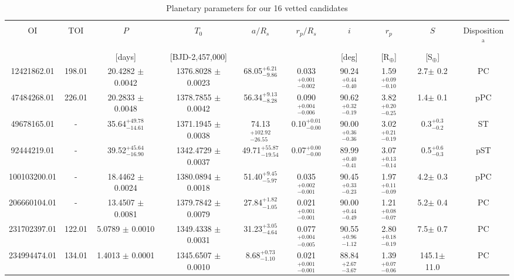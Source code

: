 \clearpage
\begin{landscape}
\begin{table*}
  \small
  \renewcommand{\arraystretch}{0.7}
  \caption{Planetary parameters for our 16 vetted candidates}
  \label{oriontable:planets}
  \begin{tabular}{cccccccccc}
    \hline \\ [-1ex]
    OI & TOI & $P$ & $T_0$ & $a/R_s$ & $r_p/R_s$ & $i$ & $r_p$ & $S$ & Disposition$^{\text{a}}$ \\ 
    &  & [days] & [BJD-2,457,000] &  &  & [deg] & [R$_{\oplus}$] & [S$_{\oplus}$] & \\
    \hline
    12421862.01 & 198.01 & 20.4282 $\pm$ 0.0042 & 1376.8028 $\pm$ 0.0023 & 68.05$^{+6.21}_{-9.86}$ & 0.033$^{+0.001}_{-0.002}$ & 90.24$^{+0.44}_{-0.40}$ & 1.59$^{+0.09}_{-0.10}$ & 2.7$\pm$ 0.2 & PC \\ 
    47484268.01 & 226.01 & 20.2833 $\pm$ 0.0048 & 1378.7855 $\pm$ 0.0042 & 56.34$^{+9.13}_{-8.28}$ & 0.090$^{+0.004}_{-0.006}$ & 90.62$^{+0.32}_{-0.19}$ & 3.82$^{+0.20}_{-0.25}$ & 1.4$\pm$ 0.1 & pPC \\ 
    49678165.01 & - & 35.64$^{+49.78}_{-14.61}$ & 1371.1945 $\pm$ 0.0038 & 74.13$^{+102.92}_{-26.55}$ & 0.10$^{+0.01}_{-0.00}$ & 90.00$^{+0.36}_{-0.36}$ & 3.02$^{+0.21}_{-0.19}$ & 0.3$^{+0.3}_{-0.2}$ & ST \\ 
    92444219.01 & - & 39.52$^{+45.64}_{-16.90}$ & 1342.4729 $\pm$ 0.0037 & 49.71$^{+55.87}_{-19.54}$ & 0.07$^{+0.00}_{-0.00}$ & 89.99$^{+0.40}_{-0.41}$ & 3.07$^{+0.13}_{-0.14}$ & 0.5$^{+0.6}_{-0.3}$ & pST \\ 
    100103200.01 & - & 18.4462 $\pm$ 0.0024 & 1380.0894 $\pm$ 0.0018 & 51.40$^{+9.45}_{-5.97}$ & 0.035$^{+0.002}_{-0.001}$ & 90.45$^{+0.33}_{-0.23}$ & 1.97$^{+0.11}_{-0.09}$ & 4.2$\pm$ 0.3 & pPC \\ 
    206660104.01 & - & 13.4507 $\pm$ 0.0081 & 1379.7842 $\pm$ 0.0079 & 27.84$^{+1.82}_{-1.05}$ & 0.021$^{+0.001}_{-0.001}$ & 90.00$^{+0.44}_{-0.49}$ & 1.21$^{+0.08}_{-0.07}$ & 5.2$\pm$ 0.4 & PC \\ 
    231702397.01 & 122.01 & 5.0789 $\pm$ 0.0010 & 1349.4338 $\pm$ 0.0031 & 31.23$^{+3.05}_{-4.64}$ & 0.077$^{+0.004}_{-0.005}$ & 90.55$^{+0.96}_{-1.12}$ & 2.80$^{+0.18}_{-0.19}$ & 7.5$\pm$ 0.7 & PC \\ 
    234994474.01 & 134.01 & 1.4013 $\pm$ 0.0001 & 1345.6507 $\pm$ 0.0010 & 8.68$^{+0.73}_{-1.10}$ & 0.021$^{+0.001}_{-0.001}$ & 88.84$^{+2.67}_{-3.67}$ & 1.39$^{+0.07}_{-0.06}$ & 145.1$\pm$ 11.0 & PC \\ 

\end{tabular}
\end{table*}
\end{landscape}
